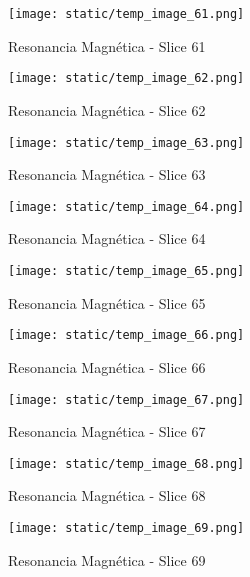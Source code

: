 \documentclass[12pt,a4paper]{article}%
\begin{document}
%


\begin{figure}[H]%
\centering%
\texttt{[image: static/temp\_image\_61.png]}%
\caption{Resonancia Magnética {-} Slice 61}%
\end{figure}

%


\begin{figure}[H]%
\centering%
\texttt{[image: static/temp\_image\_62.png]}%
\caption{Resonancia Magnética {-} Slice 62}%
\end{figure}

%


\begin{figure}[H]%
\centering%
\texttt{[image: static/temp\_image\_63.png]}%
\caption{Resonancia Magnética {-} Slice 63}%
\end{figure}

%


\begin{figure}[H]%
\centering%
\texttt{[image: static/temp\_image\_64.png]}%
\caption{Resonancia Magnética {-} Slice 64}%
\end{figure}

%


\begin{figure}[H]%
\centering%
\texttt{[image: static/temp\_image\_65.png]}%
\caption{Resonancia Magnética {-} Slice 65}%
\end{figure}

%


\begin{figure}[H]%
\centering%
\texttt{[image: static/temp\_image\_66.png]}%
\caption{Resonancia Magnética {-} Slice 66}%
\end{figure}

%


\begin{figure}[H]%
\centering%
\texttt{[image: static/temp\_image\_67.png]}%
\caption{Resonancia Magnética {-} Slice 67}%
\end{figure}

%


\begin{figure}[H]%
\centering%
\texttt{[image: static/temp\_image\_68.png]}%
\caption{Resonancia Magnética {-} Slice 68}%
\end{figure}

%


\begin{figure}[H]%
\centering%
\texttt{[image: static/temp\_image\_69.png]}%
\caption{Resonancia Magnética {-} Slice 69}%
\end{figure}
\end{document}
